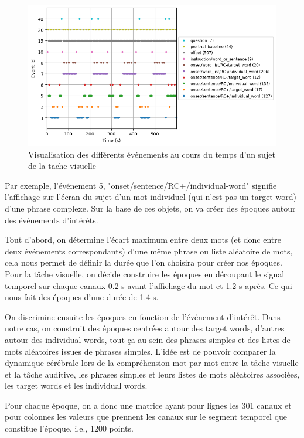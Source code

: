 \begin{figure}[!ht]
    \centering
    \includegraphics[width=17cm]{events_vis.png}
    \caption{Visualisation des différents événements au cours du temps d'un sujet de la tache visuelle}
    \label{fig3.5}
\end{figure} 

\vspace{2ex}
Par exemple, l'événement 5, "onset/sentence/RC+/individual-word" signifie l'affichage sur l'écran du sujet d'un mot individuel (qui n'est pas un target word) d'une phrase complexe. Sur la base de ces objets, on va créer des époques autour des événements d'intérêts.

\vspace{2ex}
Tout d'abord, on détermine l'écart maximum entre deux mots (et donc entre deux événements correspondants) d'une même phrase ou liste aléatoire de mots, cela nous permet de définir la durée que l'on choisira pour créer nos époques. Pour la tâche visuelle, on décide construire les époques en découpant le signal temporel sur chaque canaux 0.2 s avant l'affichage du mot et 1.2 s après. Ce qui nous fait des époques d'une durée de 1.4 s.

\vspace{2ex}
On discrimine ensuite les époques en fonction de l'événement d'intérêt. Dans notre cas, on construit des époques centrées autour des target words, d'autres autour des individual words, tout ça au sein des phrases simples et des listes de mots aléatoires issues de phrases simples. L'idée est de pouvoir comparer la dynamique cérébrale lors de la compréhension mot par mot entre la tâche visuelle et la tâche auditive, les phrases simples et leurs listes de mots aléatoires associées, les target words et les individual words.

\vspace{2ex}
Pour chaque époque, on a donc une matrice ayant pour lignes les 301 canaux et pour colonnes les valeurs que prennent les canaux sur le segment temporel que constitue l'époque, i.e., 1200 points.

